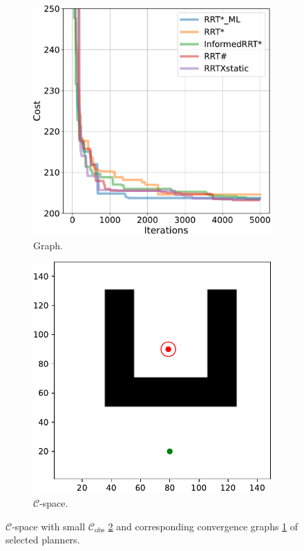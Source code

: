 \documentclass{ctuthesis}
\begin{document}
\begin{figure}[!ht]
  \centering 
  \begin{subfigure}[b]{0.48\textwidth}
    \includegraphics[width=\textwidth]{figChap5/graph_U_20pt_ticks.pdf}  
    \caption{Graph.}
    \label{fig:maze_U_graphs}
  \end{subfigure}
  \begin{subfigure}[b]{0.49\textwidth}
      \includegraphics[width=\textwidth]{figChap5/Maze_U_ticks.pdf}
      \caption{$\mathcal{C}$-space.}
      \label{fig:maze_U_Cspace} 
  \end{subfigure}  
  \caption{$\mathcal{C}$-space with small $\mathcal{C}_\text{obs} $ \ref{fig:maze_U_Cspace} and 
  corresponding convergence graphs \ref{fig:maze_U_graphs} of selected planners.}
  \label{fig:maze_U}
\end{figure}
\end{document}
